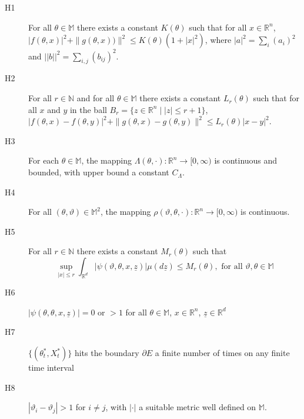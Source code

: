 \documentclass[copyright,creativecommons]{eptcs}
\begin{document}
\begin{description}
\item[H1] For all $\theta \in \mathbb{M}$ there exists a constant
$K(\theta)$ such that for all $x \in \mathbb{R}^{n}$, $|
f(\theta,x) |^2 + \| g(\theta,x)) \|^2 \leq K(\theta)(1+ |x|^2)$,
where $|a|^2 = \sum_i(a_i)^2$ and $||b||^2 =
\sum_{i,j}(b_{ij})^2$.

\item[H2] For all $r \in \mathbb{N}$ and for all $\theta \in
\mathbb{M}$ there exists a constant $L_r(\theta)$ such that for
all $x$ and $y$ in the ball $B_r = \{ z \in \mathbb{R}^{n} \mid
|z| \leq r+1\}$, $| f(\theta,x) - f(\theta,y) |^2 + \| g(\theta,x)
-g(\theta,y) \|^2 \leq L_r(\theta) |x-y|^2$.

\item[H3] For each $\theta \in \mathbb{M}$, the mapping $\Lambda(\theta,
\cdot): \mathbb{R}^{n} \to [0,\infty)$ is continuous and
bounded, with upper bound a constant $C_{\Lambda}$.

\item[H4] For all $(\theta, \vartheta) \in \mathbb{M}^2$, the mapping
$\rho(\vartheta, \theta,\cdot): \mathbb{R}^{n} \to [0,\infty)$
is continuous.

\item[H5] For all $r \in \mathbb{N}$ there exists a constant
$M_r(\theta)$ such that
\vspace{-3mm}
\[
\sup_{|x| \leq r} \int_{\mathbb{R}^d} | \psi(\vartheta, \theta,x,
\underline{z}) | \mu(d\underline{z}) \leq M_r (\theta), \mbox{ for
all } \vartheta, \theta \in \mathbb{M}
\]
\item[H6] $| \psi(\theta, \theta, x ,
\underline{z})| = 0$ or $>1$ for all $\theta \in \mathbb{M}$, $x
\in \mathbb{R}^{n}$, $\underline{z} \in \mathbb{R}^d$

\item[H7] $\{(\theta_t^*,X_t^*)\}$ hits the
boundary $\partial E$ a finite number of times on
any finite time interval

\item[H8] $|\vartheta_i - \vartheta_j|>1$ for $i \neq j$, with
$| \cdot |$ a suitable metric well defined on $\mathbb{M}$.

\end{description}
\end{document}
